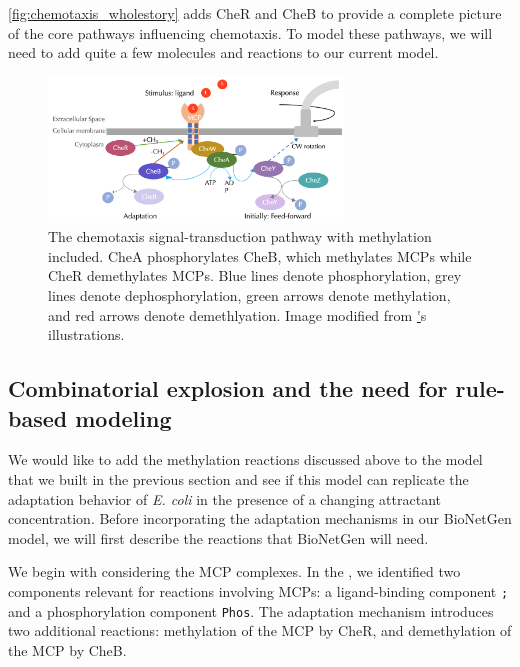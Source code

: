 \autoref{fig:chemotaxis_wholestory} adds CheR and CheB to provide a complete picture of the core pathways influencing chemotaxis. To model these pathways, we will need to add quite a few molecules and reactions to our current model.

\begin{figure}[h]
\centering
\mySfFamily
\includegraphics[width = 0.7\textwidth]{../images/chemotaxis_wholestory.png}
\caption{The chemotaxis signal-transduction pathway with methylation included. CheA phosphorylates CheB, which methylates MCPs while CheR demethylates MCPs. Blue lines denote phosphorylation, grey lines denote dephosphorylation, green arrows denote methylation, and red arrows denote demethlyation. Image modified from \href{http://chemotaxis.biology.utah.edu/Parkinson_Lab/projects/ecolichemotaxis/ecolichemotaxis.html}'s illustrations.}
\label{fig:chemotaxis_wholestory}
\end{figure}


\FloatBarrier
{}
\subsection{Combinatorial explosion and the need for rule-based modeling}

We would like to add the methylation reactions discussed above to the model that we built in the previous section and see if this model can replicate the adaptation behavior of \textit{E. coli} in the presence of a changing attractant concentration. Before incorporating the adaptation mechanisms in our BioNetGen model, we will first describe the reactions that BioNetGen will need.

We begin with considering the MCP complexes. In the , we identified two components relevant for reactions involving MCPs: a ligand-binding component \texttt{;} and a phosphorylation component \texttt{Phos}. The adaptation mechanism introduces two additional reactions: methylation of the MCP by CheR, and demethylation of the MCP by CheB.

